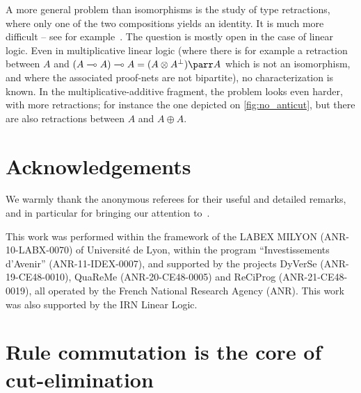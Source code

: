 \documentclass{lmcs}
\newcommand*{\orth}{^\perp} %
\newcommand*{\tens}{\otimes} %
\newcommand*{\lolipop}{\multimap} %
\begin{document}
A more general problem than isomorphisms is the study of type retractions, where only one of the two compositions yields an identity.
It is much more difficult -- see for example~\cite{retractmany}.
The question is mostly open in the case of linear logic.
Even in multiplicative linear logic (where there is for example a retraction between $A$ and $(A\lolipop A)\lolipop A = (A\tens A\orth)\parr A$ which is not an isomorphism, and where the associated proof-nets are not bipartite), no characterization is known.
In the multiplicative-additive fragment, the problem looks even harder, with more retractions; for instance the one depicted on \autoref{fig:no_anticut}, but there are also retractions between $A$ and $A\oplus A$.


\section*{Acknowledgements}

We warmly thank the anonymous referees for their useful and detailed remarks, and in particular for bringing our attention to~\cite{calculusformall}.

This work was performed within the framework of the LABEX MILYON (ANR-10-LABX-0070) of Universit\'e de Lyon, within the program ``Investissements d'Avenir'' (ANR-11-IDEX-0007), and supported by the projects DyVerSe (ANR-19-CE48-0010), QuaReMe (ANR-20-CE48-0005) and ReCiProg (ANR-21-CE48-0019), all operated by the French National Research Agency (ANR). This work was also supported by the IRN Linear Logic.






\newpage
\appendix


\section{Rule commutation is the core of cut-elimination}
\label{subsec:proofs_add_1}
\end{document}
